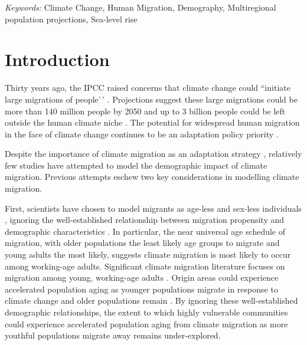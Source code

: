 \documentclass[12pt]{article}
\begin{document}
\noindent%
{\it Keywords:} Climate Change, Human
Migration, Demography, Multiregional population projections, Sea-level
rise
\vfill

\newpage
{} %

\hypertarget{introduction}{%
\section{Introduction}\label{introduction}}

Thirty years ago, the IPCC raised concerns that climate change could
``initiate large migrations of people'\,' \citep{ipcc_climate_1992}.
Projections suggest these large migrations could be more than 140
million people by 2050 \citep{rigaud2018groundswell} and up to 3 billion
people could be left outside the human climate niche
\citep{xu2020future}. The potential for widespread human migration in
the face of climate change continues to be an adaptation policy priority
\citep{white_house_mig2021}.

Despite the importance of climate migration as an adaptation strategy
\citep{blackClimateChangeMigration2011}, relatively few studies have
attempted to model the demographic impact of climate migration. Previous
attempts eschew two key considerations in modelling climate migration.

First, scientists have chosen to model migrants as age-less and sex-less
individuals
\citep{hauerMigrationInducedSealevel2017, davisUniversalModelPredicting2018, de_lellis_modeling_2021, rigaud2018groundswell},
ignoring the well-established relationship between migration propensity
and demographic characteristics
\citep{blackClimateChangeMigration2011, clarkInterpretingMigrationPrism2015, rogers1988age}.
In particular, the near universal age schedule of migration, with older
populations the least likely age groups to migrate and young adults the
most likely, suggests climate migration is most likely to occur among
working-age adults. Significant climate migration literature focuses on
migration among young, working-age adults
\citep{setoExploringDynamicsMigration2011, lilleor2011economic, shenContrastedViewsEnvironmental2011, donnerObstaclesClimateChange2014}.
Origin areas could experience accelerated population aging as younger
populations migrate in response to climate change and older populations
remain \citep{matos-moreno_migration_2021}. By ignoring these
well-established demographic relationships, the extent to which highly
vulnerable communities could experience accelerated population aging
from climate migration as more youthful populations migrate away remains
under-explored.
\end{document}
